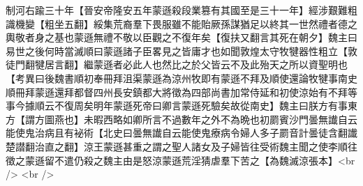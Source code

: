 制河右踰三十年【晉安帝隆安五年蒙遜殺段業篡有其國至是三十一年】經涉艱難粗識機變【粗坐五翻】綏集荒裔羣下畏服雖不能貽厥孫謀猶足以終其一世然禮者德之輿敬者身之基也蒙遜無禮不敬以臣觀之不復年矣【復扶又翻言其死在朝夕】魏主曰易世之後何時當滅順曰蒙遜諸子臣畧見之皆庸才也如聞敦煌太守牧犍器性粗立【敦徒門翻犍居言翻】繼蒙遜者必此人也然比之於父皆云不及此殆天之所以資聖明也　【考異曰後魏書順初奉冊拜沮渠蒙遜為涼州牧即有蒙遜不拜及順使還論牧犍事南史順冊拜蒙遜還拜都督四州長安鎮都大將徵為四部尚書加常侍延和初使涼始有不拜等事今據順云不復周矣明年蒙遜死帝曰卿言蒙遜死驗矣故從南史】魏主曰朕方有事東方【謂方圖燕也】未暇西略如卿所言不過數年之外不為晩也初罽賓沙門曇無䜟自云能使鬼治病且有袐術【北史曰曇無䜟自云能使鬼療病令婦人多子罽音計曇徒含翻䜟楚譛翻治直之翻】涼王蒙遜甚重之謂之聖人諸女及子婦皆往受術魏主聞之使李順往徵之蒙遜留不遣仍殺之魏主由是怒涼蒙遜荒淫猜虐羣下苦之【為魏滅涼張本】<br />
<br />
